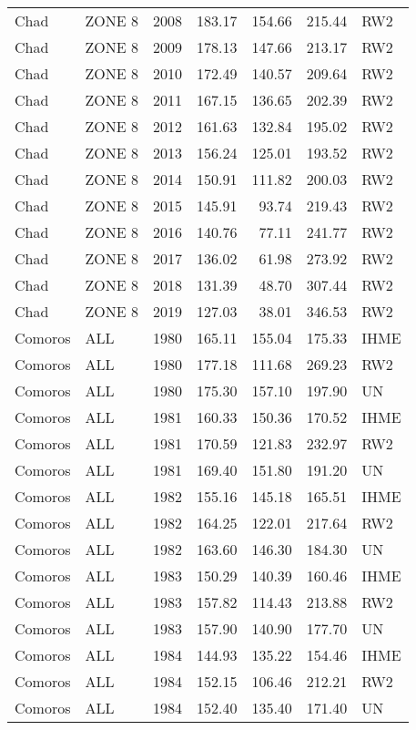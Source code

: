\begin{longtable}{lllrrrl}
  Chad & ZONE 8 & 2008 & 183.17 & 154.66 & 215.44 & RW2 \\ 
  Chad & ZONE 8 & 2009 & 178.13 & 147.66 & 213.17 & RW2 \\ 
  Chad & ZONE 8 & 2010 & 172.49 & 140.57 & 209.64 & RW2 \\ 
  Chad & ZONE 8 & 2011 & 167.15 & 136.65 & 202.39 & RW2 \\ 
  Chad & ZONE 8 & 2012 & 161.63 & 132.84 & 195.02 & RW2 \\ 
  Chad & ZONE 8 & 2013 & 156.24 & 125.01 & 193.52 & RW2 \\ 
  Chad & ZONE 8 & 2014 & 150.91 & 111.82 & 200.03 & RW2 \\ 
  Chad & ZONE 8 & 2015 & 145.91 & 93.74 & 219.43 & RW2 \\ 
  Chad & ZONE 8 & 2016 & 140.76 & 77.11 & 241.77 & RW2 \\ 
  Chad & ZONE 8 & 2017 & 136.02 & 61.98 & 273.92 & RW2 \\ 
  Chad & ZONE 8 & 2018 & 131.39 & 48.70 & 307.44 & RW2 \\ 
  Chad & ZONE 8 & 2019 & 127.03 & 38.01 & 346.53 & RW2 \\ 
  Comoros & ALL & 1980 & 165.11 & 155.04 & 175.33 & IHME \\ 
  Comoros & ALL & 1980 & 177.18 & 111.68 & 269.23 & RW2 \\ 
  Comoros & ALL & 1980 & 175.30 & 157.10 & 197.90 & UN \\ 
  Comoros & ALL & 1981 & 160.33 & 150.36 & 170.52 & IHME \\ 
  Comoros & ALL & 1981 & 170.59 & 121.83 & 232.97 & RW2 \\ 
  Comoros & ALL & 1981 & 169.40 & 151.80 & 191.20 & UN \\ 
  Comoros & ALL & 1982 & 155.16 & 145.18 & 165.51 & IHME \\ 
  Comoros & ALL & 1982 & 164.25 & 122.01 & 217.64 & RW2 \\ 
  Comoros & ALL & 1982 & 163.60 & 146.30 & 184.30 & UN \\ 
  Comoros & ALL & 1983 & 150.29 & 140.39 & 160.46 & IHME \\ 
  Comoros & ALL & 1983 & 157.82 & 114.43 & 213.88 & RW2 \\ 
  Comoros & ALL & 1983 & 157.90 & 140.90 & 177.70 & UN \\ 
  Comoros & ALL & 1984 & 144.93 & 135.22 & 154.46 & IHME \\ 
  Comoros & ALL & 1984 & 152.15 & 106.46 & 212.21 & RW2 \\ 
  Comoros & ALL & 1984 & 152.40 & 135.40 & 171.40 & UN \\ 

\end{longtable}
